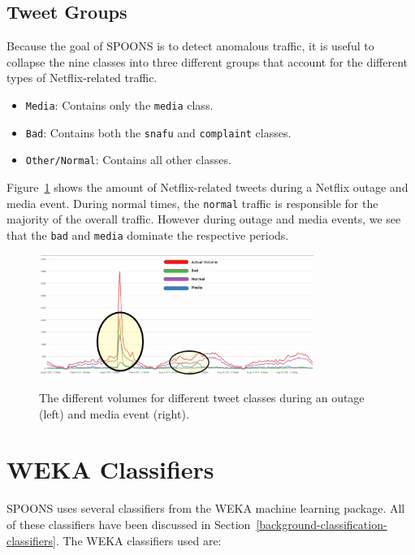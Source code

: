 \documentclass[12pt]{ucthesis}
\newcommand{\captionfonts}{\small\bf\ssp}
\begin{document}
\subsection{Tweet Groups}
\label{class-tweet-groups}
Because the goal of SPOONS is to detect anomalous traffic, it is useful to collapse the nine classes into
three different groups that account for the different types of Netflix-related traffic.

\begin{itemize}
  \item \texttt{Media}: Contains only the \texttt{media} class.
  \item \texttt{Bad}: Contains both the \texttt{snafu} and \texttt{complaint} classes.
  \item \texttt{Other/Normal}: Contains all other classes.
\end{itemize}

Figure~\ref{fig:groups} shows the amount of Netflix-related tweets during a Netflix outage and media event.
During normal times, the \texttt{normal} traffic is responsible for the majority of the overall traffic.
However during outage and media events, we see that the \texttt{bad} and \texttt{media} dominate the respective
periods.

\begin{figure}
   \begin{center}
      \includegraphics[width=0.8\textwidth]{images/groups.eps}
      \captionfonts
      \caption[SPOONS Groups]{The different volumes for different tweet classes during an outage (left) and media event (right).}
      \label{fig:groups}
   \end{center}
\end{figure}

\section{WEKA Classifiers}
\label{class-weka}
SPOONS uses several classifiers from the WEKA machine learning package\cite{weka}.
All of these classifiers have been discussed in Section~\ref{background-classification-classifiers}.
The WEKA classifiers used are:
\end{document}

